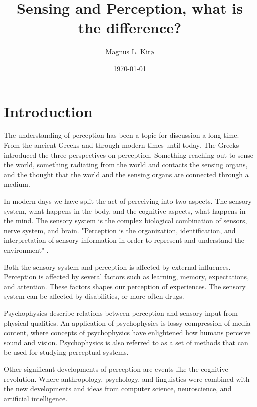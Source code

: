 \documentclass[12pt, a4paper]{article}
\title{
	Sensing and Perception, what is the difference?
}
\author{
	Magnus L. Kirø \\
}
\date{\today}
\begin{document}
\maketitle
{}


\section{Introduction}

The understanding of perception has been a topic for discussion a long time.
From the ancient Greeks and through modern times until today. The Greeks
introduced the three perspectives on perception. Something reaching out to
sense the world, something radiating from the world and contacts the sensing
organs, and the thought that the world and the sensing organs are connected
through a medium. 

In modern days we have split the act of perceiving into two aspects. The
sensory system, what happens in the body, and the cognitive aspects, what
happens in the mind. The sensory system is the complex biological combination
of sensors, nerve system, and brain. "Perception is the organization,
identification, and interpretation of sensory information in order to represent
and understand the environment" \cite{Wiki-perception}.

Both the sensory system and perception is affected by external influences. 
Perception is affected by several factors such as learning, memory,
expectations, and attention. These factors shapes our perception of
experiences. The sensory system can be affected by disabilities, or more often
drugs. 

Psychophysics describe relations between perception and sensory input from
physical qualities. An application of psychophysics is lossy-compression of
media content, where concepts of psychophysics have enlightened how humans
perceive sound and vision. Psychophysics is also referred to as a set of
methods that can be used for studying perceptual systems.
\cite{Wiki-psychophysics} 

Other significant developments of perception are events like the cognitive
revolution. Where anthropology, psychology, and linguistics were combined with
the new developments and ideas from computer science, neuroscience, and
artificial intelligence. \cite{Wiki-cognitiveRevolution} 
\end{document}

